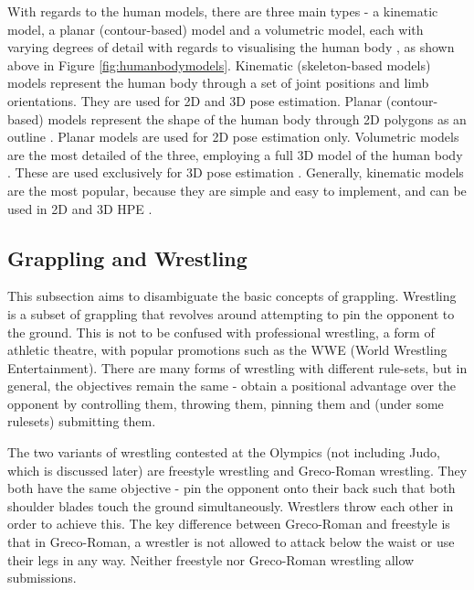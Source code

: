 \documentclass[a4paper, oneside, 11pt]{article}
\begin{document}
With regards to the human models, there are three main types - a kinematic model, a planar (contour-based) model and a volumetric model, each with varying degrees of detail with regards to visualising the human body \cite{HPEFitnessRehab}\cite{HPEDeepLearningMethods}\cite{HPEVisoAI}, as shown above in Figure \ref{fig:humanbodymodels}. Kinematic (skeleton-based models) models represent the human body through a set of joint positions and limb orientations. They are used for 2D and 3D pose estimation. Planar (contour-based) models represent the shape of the human body through 2D polygons as an outline \cite{HPEVisoAI}\cite{HPEDeepLearningMethods}. Planar models are used for 2D pose estimation only. Volumetric models are the most detailed of the three, employing a full 3D model of the human body \cite{HPEDeepLearningMethods}. These are used exclusively for 3D pose estimation \cite{HPEVisoAI}. Generally, kinematic models are the most popular, because they are simple and easy to implement, and can be used in 2D and 3D HPE \cite{HPEFitnessRehab}\cite{HPEUltimateGuide}.


\subsection{Grappling and Wrestling}

This subsection aims to disambiguate the basic concepts of grappling.
Wrestling is a subset of grappling that revolves around attempting to pin the opponent to the ground. This is not to be confused with professional wrestling, a form of athletic theatre, with popular promotions such as the WWE (World Wrestling Entertainment). There are many forms of wrestling with different rule-sets, but in general, the objectives remain the same - obtain a positional advantage over the opponent by controlling them, throwing them, pinning them and (under some rulesets) submitting them. 

The two variants of wrestling contested at the Olympics (not including Judo, which is discussed later) are freestyle wrestling and Greco-Roman wrestling. They both have the same objective - pin the opponent onto their back such that both shoulder blades touch the ground simultaneously. Wrestlers throw each other in order to achieve this. The key difference between Greco-Roman and freestyle is that in Greco-Roman, a wrestler is not allowed to attack below the waist or use their legs in any way. Neither freestyle nor Greco-Roman wrestling allow submissions.
\end{document}
